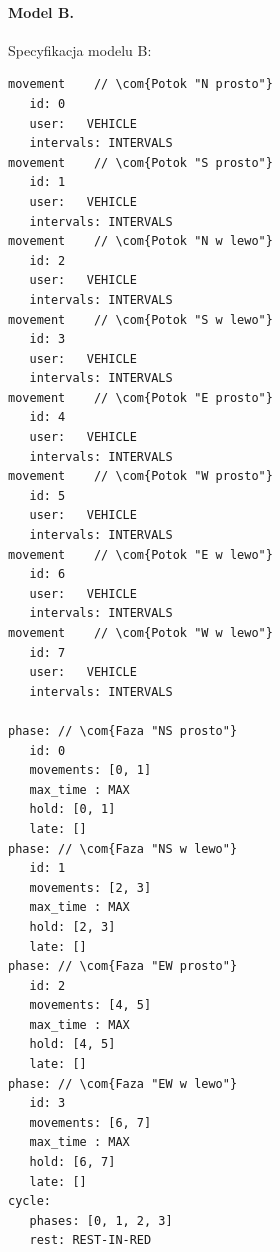 \documentclass{pracamgr}
\theoremstyle{plain}
\newcommand{\com}[1]{\upshape\color{light-gray}{#1}}
\begin{document}
\paragraph {Model B.} Specyfikacja modelu B:

\begin{lstlisting}[caption=Specyfikacja modelu B.]
movement    // \com{Potok "N prosto"}
   id: 0    
   user:   VEHICLE
   intervals: INTERVALS
movement    // \com{Potok "S prosto"}
   id: 1    
   user:   VEHICLE
   intervals: INTERVALS
movement    // \com{Potok "N w lewo"}
   id: 2    
   user:   VEHICLE
   intervals: INTERVALS
movement    // \com{Potok "S w lewo"}
   id: 3    
   user:   VEHICLE
   intervals: INTERVALS
movement    // \com{Potok "E prosto"}
   id: 4    
   user:   VEHICLE
   intervals: INTERVALS
movement    // \com{Potok "W prosto"}
   id: 5    
   user:   VEHICLE
   intervals: INTERVALS
movement    // \com{Potok "E w lewo"}
   id: 6    
   user:   VEHICLE
   intervals: INTERVALS
movement    // \com{Potok "W w lewo"}
   id: 7    
   user:   VEHICLE
   intervals: INTERVALS

phase: // \com{Faza "NS prosto"}
   id: 0
   movements: [0, 1]
   max_time : MAX
   hold: [0, 1]
   late: []
phase: // \com{Faza "NS w lewo"}
   id: 1
   movements: [2, 3]
   max_time : MAX
   hold: [2, 3]
   late: []
phase: // \com{Faza "EW prosto"}
   id: 2
   movements: [4, 5]
   max_time : MAX
   hold: [4, 5]
   late: []
phase: // \com{Faza "EW w lewo"}
   id: 3
   movements: [6, 7]
   max_time : MAX
   hold: [6, 7]
   late: []
cycle:
   phases: [0, 1, 2, 3]
   rest: REST-IN-RED
\end{lstlisting}
\end{document}
